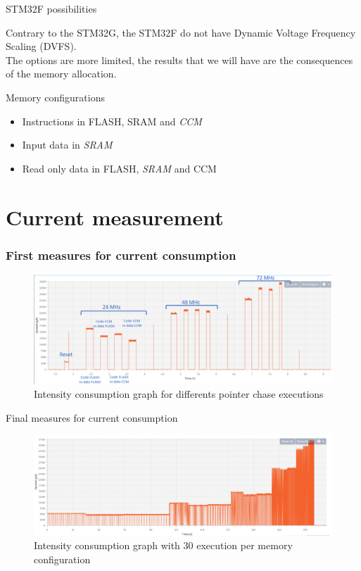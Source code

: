 \documentclass[
	11pt, %
]{beamer}
\begin{document}
\begin{frame}{STM32F possibilities}

\begin{block}{}
	Contrary to the STM32G, the STM32F do not have Dynamic Voltage Frequency Scaling (DVFS).\\
	The options are more limited, the results that we will have are the consequences of the memory allocation.
\end{block}
\begin{block}{Memory configurations }
	\begin{itemize}
		\item Instructions in FLASH, SRAM and \emph{CCM}
		\item Input data in \emph{SRAM}
		\item Read only data in FLASH, \emph{SRAM} and CCM
	\end{itemize}
\end{block}
	
\end{frame}


\section{Current measurement} %
\begin{frame}
	\frametitle{First measures for current consumption}
	\begin{figure}
		\centering
        \includegraphics[scale=0.6]{images/pointer_chase_capture_mod.png}
        \caption{Intensity consumption graph for differents pointer chase executions}
	\end{figure}
\end{frame}

\begin{frame}{Final measures for current consumption}
	\begin{figure}
		\centering
        \includegraphics[scale=0.4]{images/pointer_chase30ex.png}
        \caption{Intensity consumption graph with 30 execution per memory configuration}
	\end{figure}
\end{frame}
\end{document}
